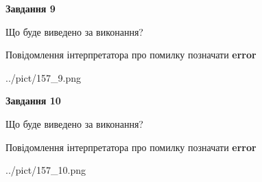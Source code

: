 \documentclass[12pt, ukrainian]{article}
\begin{document}
{{\begin {center}\textbf{Завдання 9}\end {center}}\par
Що буде виведено за виконання? \par
Повідомлення інтерпретатора про помилку позначати \textbf{error}

\begin{center}
	{../pict/157_9.png}
\end{center}
\newpage

{\begin {center}\textbf{Завдання 10}\end {center}}\par
Що буде виведено за виконання? \par
Повідомлення інтерпретатора про помилку позначати \textbf{error}

\begin{center}
	{../pict/157_10.png}
\end{center}
\newpage

}
\end{document}
